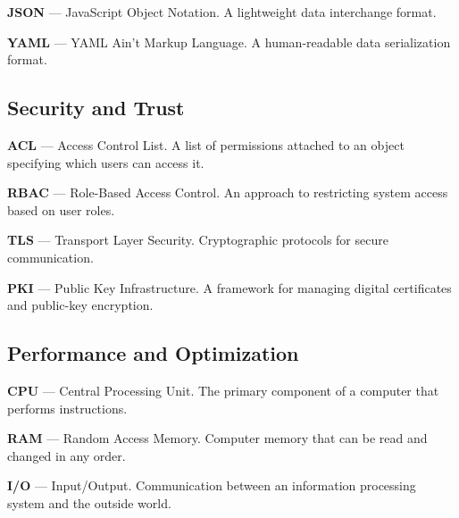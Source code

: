\noindent\textbf{JSON} --- JavaScript Object Notation. A lightweight data interchange format.

\vspace{0.2cm}

\noindent\textbf{YAML} --- YAML Ain't Markup Language. A human-readable data serialization format.

\subsection*{Security and Trust}

\vspace{0.3cm}

\noindent\textbf{ACL} --- Access Control List. A list of permissions attached to an object specifying which users can access it.

\vspace{0.2cm}

\noindent\textbf{RBAC} --- Role-Based Access Control. An approach to restricting system access based on user roles.

\vspace{0.2cm}

\noindent\textbf{TLS} --- Transport Layer Security. Cryptographic protocols for secure communication.

\vspace{0.2cm}

\noindent\textbf{PKI} --- Public Key Infrastructure. A framework for managing digital certificates and public-key encryption.

\subsection*{Performance and Optimization}

\vspace{0.3cm}

\noindent\textbf{CPU} --- Central Processing Unit. The primary component of a computer that performs instructions.

\vspace{0.2cm}

\noindent\textbf{RAM} --- Random Access Memory. Computer memory that can be read and changed in any order.

\vspace{0.2cm}

\noindent\textbf{I/O} --- Input/Output. Communication between an information processing system and the outside world.

